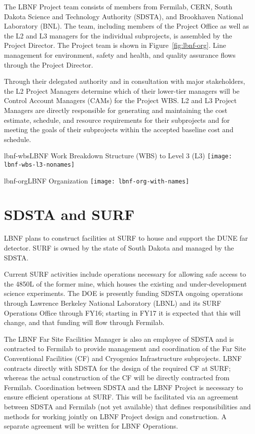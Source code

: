 The LBNF Project team consists of members from Fermilab, CERN, South Dakota Science and Technology Authority (SDSTA), and Brookhaven National Laboratory (BNL).  The team, including members of the Project Office as well as the L2 and L3 managers for the individual subprojects, is assembled by the Project Director. The Project team is shown in Figure~\ref{fig:lbnf-org}. 
Line management for environment, safety and health, and quality assurance flows through the Project Director. 

Through their delegated authority and in consultation with major stakeholders, the L2 Project Managers determine which of their lower-tier managers will be Control Account Managers (CAMs) for the Project WBS. L2 and L3 Project Managers are directly responsible for generating and maintaining the cost estimate, schedule, and resource requirements for their subprojects and for meeting the goals of their subprojects within the accepted baseline cost and schedule. 

\begin{cdrfigure}{lbnf-wbs}{LBNF Work Breakdown Structure (WBS) to Level 3 (L3)}
\texttt{[image: lbnf-wbs-l3-nonames]}
\end{cdrfigure}


\begin{cdrfigure}{lbnf-org}{LBNF Organization}
\texttt{[image: lbnf-org-with-names]}
\end{cdrfigure}

\section{SDSTA and SURF}

LBNF plans to construct facilities at SURF to house and support the DUNE far detector. SURF is owned by the state of South Dakota and managed by the SDSTA. 

Current SURF activities include operations necessary for allowing safe access to the 4850L of the former mine, which houses the existing and under-development science experiments. The DOE is presently funding SDSTA ongoing operations through Lawrence Berkeley National Laboratory (LBNL) and its SURF Operations Office through FY16; starting in FY17 it is expected that this will change, and that funding will flow through Fermilab. 

The LBNF Far Site Facilities Manager is also an employee of SDSTA and is contracted to Fermilab to provide management and coordination of the Far Site Conventional Facilities (CF) and Cryogenics Infrastructure subprojects. LBNF contracts directly with SDSTA for the design of the required CF at SURF; whereas the actual construction of the CF will be directly contracted from Fermilab. Coordination between SDSTA and the LBNF Project is necessary to ensure efficient operations at SURF. This will be facilitated via an agreement between SDSTA and Fermilab (not yet available) that defines responsibilities and methods for working jointly on LBNF Project design and construction. A separate agreement will be written for LBNF Operations. 

